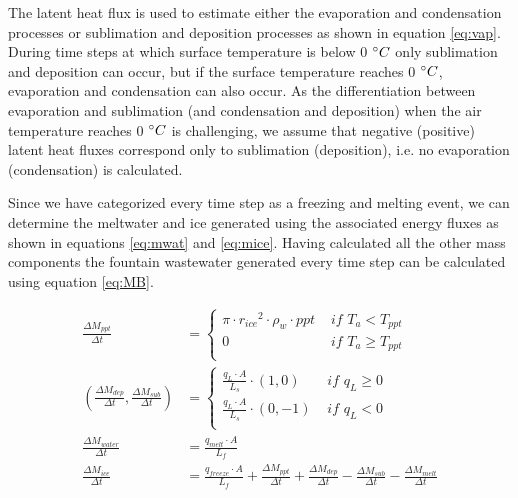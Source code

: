 \documentclass[utf8]{frontiersSCNS} %
\begin{document}
The latent heat flux is used to estimate either the evaporation and condensation processes or sublimation and deposition
processes as shown in equation \ref{eq:vap}. During time steps at which surface temperature is below 0 $\degree C$ only
sublimation and deposition can occur, but if the surface temperature reaches 0 $\degree C$, evaporation and condensation
can also occur. As the differentiation between evaporation and sublimation (and condensation and deposition) when the
air temperature reaches 0 $\degree C$ is challenging, we assume that negative (positive) latent heat fluxes correspond
only to sublimation (deposition), i.e. no evaporation (condensation) is calculated.

Since we have categorized every time step as a freezing and melting event, we can determine the meltwater and  ice
generated using the associated energy fluxes as shown in equations \ref{eq:mwat} and \ref{eq:mice}. Having
calculated all the other mass components the fountain wastewater generated every time step can be calculated using
equation \ref{eq:MB}.

\begin{subequations}
\label{equations}
\begin{align}
    \label{eq:ppt} 
    \frac{\Delta M_{ppt}}{\Delta t}  &= \left\{ \begin{array}{ll} \pi \cdot {r_{ice}}^2 \cdot
\rho_{w}\cdot ppt& \textit{ if } T_{a} < T_{ppt} \\ 0 & \textit{ if } T_{a} \geq T_{ppt} \\ \end{array} \right. \\
    \label{eq:vap} 
            (\frac{\Delta M_{dep}}{\Delta t}, \frac{\Delta M_{sub}}{\Delta t}) &= \left\{ \begin{array}{ll} \frac{q_{L}
                        \cdot A}{L_s}\cdot (1,0)& \textit{ if } q_{L} \geq 0 \\ \frac{q_{L}
            \cdot A}{L_s}\cdot (0,-1) & \textit{ if } q_{L} < 0 \\ \end{array} \right. \\
    \label{eq:mwat} 
            \frac{\Delta M_{water}}{\Delta t} &= \frac{q_{melt} \cdot A }{L_f}\\
    \label{eq:mice} 
    \frac{\Delta M_{ice}}{\Delta t} &= \frac{q_{freeze}\cdot A }{L_f} + \frac{\Delta M_{ppt}}{\Delta t} + \frac{\Delta
    M_{dep}}{\Delta t}- \frac{\Delta M_{sub}}{\Delta t}- \frac{\Delta M_{melt}}{\Delta t}
\end{align}
\end{subequations}
\end{document}
